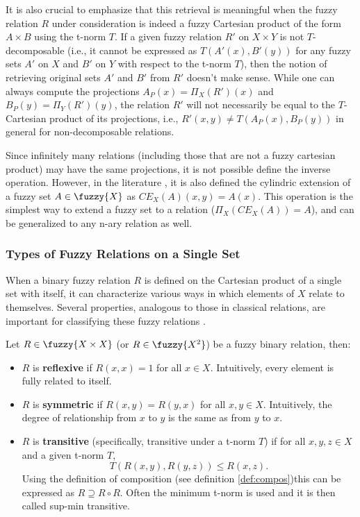   \begin{remark}
  It is also crucial to emphasize that this retrieval is meaningful when the fuzzy relation $R$ under consideration is indeed a fuzzy Cartesian product of the form $A \times B$ using the t-norm $T$. If a given fuzzy relation $R'$ on $X \times Y$ is not $T$-decomposable (i.e., it cannot be expressed as $T(A'(x), B'(y))$ for any fuzzy sets $A'$ on $X$ and $B'$ on $Y$ with respect to the t-norm $T$), then the notion of retrieving original sets $A'$ and $B'$ from $R'$ doesn't make sense. While one can always compute the projections $A_P(x) = \Pi_X(R')(x)$ and $B_P(y) = \Pi_Y(R')(y)$, the relation $R'$ will not necessarily be equal to the $T$-Cartesian product of its projections, i.e., $R'(x,y) \neq T(A_P(x), B_P(y))$ in general for non-decomposable relations.
  \end{remark}


  Since infinitely many relations (including those that are not a fuzzy cartesian product) may have the same projections, it is not possible define the inverse operation. However, in the literature \cite[p.~61]{HistoryFL2017}, it is also defined the cylindric extension of a fuzzy set $A\in\fuzzy{X}$ as $CE_X(A)(x,y) = A(x)$. This operation is the simplest way to extend a fuzzy set to a relation ($\Pi_X(CE_X(A))=A$), and can be generalized to any n-ary relation as well.\\



\subsubsection*{Types of Fuzzy Relations on a Single Set}

When a binary fuzzy relation $R$ is defined on the Cartesian product of a single set with itself, it can characterize various ways in which elements of $X$ relate to themselves. Several properties, analogous to those in classical relations, are important for classifying these fuzzy relations \cite[p.~66]{HistoryFL2017}.

\begin{definition} Let $R \in \fuzzy{X \times X}$ (or $R \in \fuzzy{X^2}$) be a fuzzy binary relation, then:
  \begin{itemize}
    \item $R$ is \textbf{reflexive} if $R(x,x) = 1$ for all $x \in X$.
          Intuitively, every element is fully related to itself.
    \item $R$ is \textbf{symmetric} if $R(x,y) = R(y,x)$ for all $x,y \in X$.
          Intuitively, the degree of relationship from $x$ to $y$ is the same as from $y$ to $x$.
    \item $R$ is \textbf{transitive} (specifically, transitive under a t-norm $T$) if for all $x,y,z \in X$ and a given t-norm $T$,
          \[ T(R(x,y), R(y,z)) \le R(x,z). \]
          Using the definition of composition (see definition \ref{def:compos})this can be expressed as $R \supseteq R \circ R$. Often the minimum t-norm is used and it is then called sup-min transitive.
  \end{itemize}
\end{definition}

